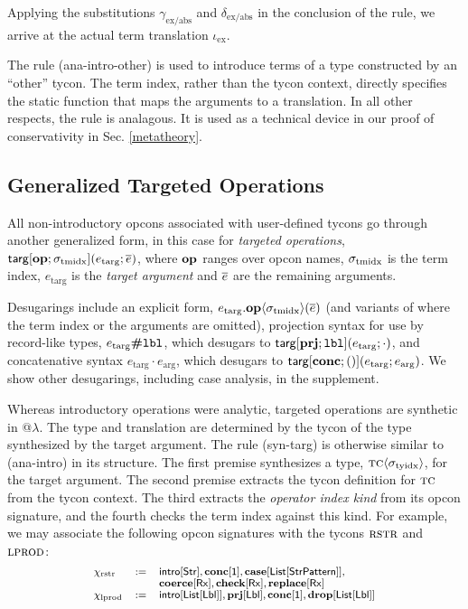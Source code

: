 \documentclass[10pt,preprint]{sigplanconf}
\begin{document}
Applying the substitutions $\gamma_\text{ex/abs}$ and $\delta_\text{ex/abs}$ in the conclusion of the rule, we arrive at the actual term translation $\iota_\text{ex}$.

The rule (ana-intro-other) is used to introduce terms of a type constructed by an ``other'' tycon. The term index, rather than the tycon context, directly specifies the static function that maps the arguments to a translation. In all other respects, the rule is analagous. It is used as a technical device in our proof of conservativity in Sec. \ref{metatheory}.

\subsection{Generalized Targeted Operations} 
All non-introductory opcons associated with user-defined tycons go through another generalized form, in this case for \emph{targeted operations}, ${\sf targ}[\textbf{op}; \sigma_\text{tmidx}](e_\text{targ}; \overline{e})$, where $\textbf{op}$ ranges over opcon names, ${\sigma_\text{tmidx}}$ is the term index, $e_\text{targ}$ is the \emph{target argument} and $\overline{e}$ are the remaining arguments. 

Desugarings include an explicit form, $e_\text{targ}.\textbf{op}\langle\sigma_\text{tmidx}\rangle(\overline{e})$ (and variants of where the term index or the arguments are omitted), projection syntax for use by record-like types, $e_\text{targ}\textbf{\#}\texttt{lbl}$, which desugars to ${\sf targ}[\textbf{prj}; \texttt{lbl}](e_\text{targ}; \cdot)$, and concatenative syntax $e_\text{targ} \cdot e_\text{arg}$, which desugars to ${\sf targ}[\textbf{conc}; ()](e_\text{targ}; e_\text{arg})$. We show other desugarings, including case analysis, in the supplement.


Whereas introductory operations were analytic, targeted operations are synthetic in @$\lambda$. The type and translation are determined by the tycon of the type synthesized by the target argument. The rule (syn-targ) is otherwise similar to (ana-intro) in its structure. The first premise synthesizes a type, ${\textsc{tc}}\langle\sigma_\text{tyidx}\rangle$, for the target argument. The second premise extracts the tycon definition for $\textsc{tc}$ from the tycon context. The third extracts the \emph{operator index kind} from its opcon signature, and the fourth checks the term index against this kind. For example, we may associate the following opcon signatures with the tycons $\textsc{rstr}$ and $\textsc{lprod}$:\[\small
\begin{array}{lcl}
\chi_\text{rstr} & := & \keyw{intro}[\keyw{Str}], \opsig{\opname{conc}}{\kunit}, \opsig{\opname{case}}{\klist{\keyw{StrPattern}}},  \\
& & \opsig{\opname{coerce}}{\krx}, \opsig{\opname{check}}{\krx}, \opsig{\opname{replace}}{\krx}\\
\chi_\text{lprod} & := & \keyw{intro}[\klist{\klbl}], \opsig{\opname{prj}}{\klbl}, \opsig{\opname{conc}}{\kunit}, \opsig{\opname{drop}}{\klist{\klbl}}
\end{array}
\]
\end{document}
